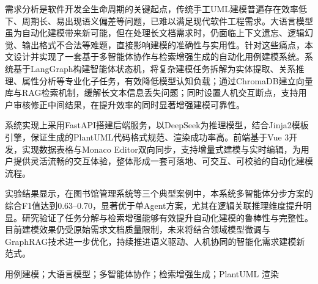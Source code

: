 \begin{abstractCN}

    需求分析是软件开发全生命周期的关键起点，传统手工UML建模普遍存在效率低下、周期长、易出现语义偏差等问题，已难以满足现代软件工程需求。大语言模型虽为自动化建模带来新可能，但在处理长文档需求时，仍面临上下文遗忘、逻辑幻觉、输出格式不合法等难题，直接影响建模的准确性与实用性。针对这些痛点，本文设计并实现了一套基于多智能体协作与检索增强生成的自动化用例建模系统。系统基于LangGraph构建智能体状态机，将复杂建模任务拆解为实体提取、关系推理、属性分析等专业化子任务，有效降低模型认知负载；通过ChromaDB建立向量库与RAG检索机制，缓解长文本信息丢失问题；同时设置人机交互断点，支持用户审核修正中间结果，在提升效率的同时显著增强建模可靠性。

    系统实现上采用FastAPI搭建后端服务，以DeepSeek为推理模型，结合Jinja2模板引擎，保证生成的PlantUML代码格式规范、渲染成功率高。前端基于Vue 3开发，实现数据表格与Monaco Editor双向同步，支持增量式建模与实时编辑，为用户提供灵活流畅的交互体验，整体形成一套可落地、可交互、可校验的自动化建模流程。

    实验结果显示，在图书馆管理系统等三个典型案例中，本系统多智能体分步方案的综合F1值达到0.63–0.70，显著优于单Agent方案，尤其在逻辑关联推理维度提升明显。研究验证了任务分解与检索增强能够有效提升自动化建模的鲁棒性与完整性。目前建模效果仍受原始需求文档质量限制，未来将结合领域模型微调与GraphRAG技术进一步优化，持续推进语义驱动、人机协同的智能化需求建模新范式。

    \keywordsCN 用例建模；大语言模型；多智能体协作；检索增强生成；PlantUML 渲染
\end{abstractCN}

